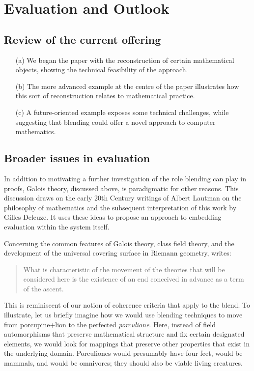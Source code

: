 \section{Evaluation and Outlook}
\label{sec:eval}

\subsection{Review of the current offering}

\begin{itemize}
\item[(a)] We began the paper with the reconstruction of certain
mathematical objects, showing the technical feasibility of the
approach. 
\item[(b)] The more advanced example at the centre of the paper
  illustrates how this sort of reconstruction relates to mathematical
  practice.
\item[(c)] A future-oriented example exposes some technical
  challenges, while suggesting that blending could offer a novel
  approach to computer mathematics.
\end{itemize}

\subsection{Broader issues in evaluation}

In addition to motivating a further investigation of the role blending
can play in proofs, Galois theory, discussed above, is paradigmatic
for other reasons.  This discussion draws on the early 20th Century
writings of Albert Lautman on the philosophy of mathematics and the
subsequent interpretation of this work by Gilles Deleuze.  It uses
these ideas to propose an approach to embedding evaluation within the
system itself.

Concerning the common features of Galois theory, class field theory,
and the development of the universal covering surface in Riemann
geometry, \cite[p. 126]{lautman2011mathematics} writes:
\begin{quote}
What is characteristic of the movement of the theories that will be
considered here is the existence of an end conceived in advance as a
term of the ascent.
\end{quote}

This is reminiscent of our notion of coherence criteria that apply to
the blend.  To illustrate, let us briefly imagine how we would use
blending techniques to move from porcupine+lion to the perfected
\emph{porculione}.  Here, instead of field automorphisms that preserve
mathematical structure and fix certain designated elements, we would
look for mappings that preserve other properties that exist in the
underlying domain.  Porculiones would presumably have four feet, would
be mammals, and would be omnivores; they should also be viable living
creatures.

